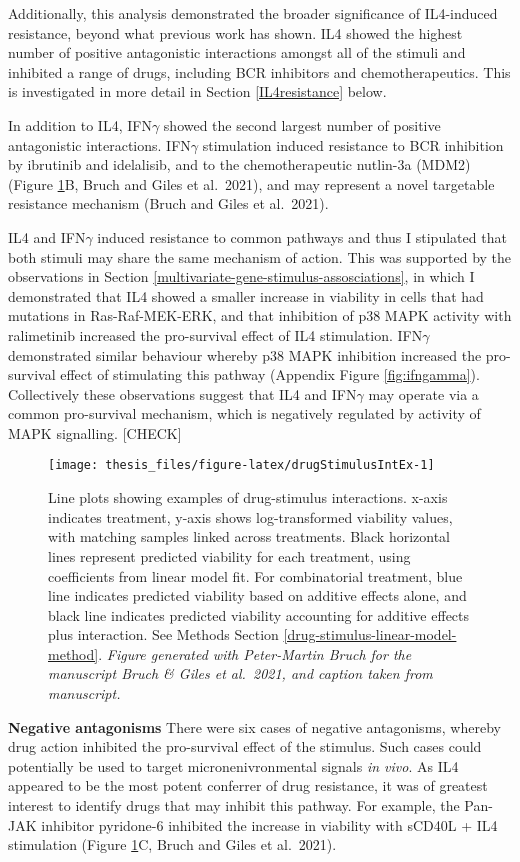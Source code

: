 \documentclass[11pt, a4paper, twosided]{book}
\begin{document}
Additionally, this analysis demonstrated the broader significance of IL4-induced resistance, beyond what previous work has shown. IL4 showed the highest number of positive antagonistic interactions amongst all of the stimuli and inhibited a range of drugs, including BCR inhibitors and chemotherapeutics. This is investigated in more detail in Section \ref{IL4resistance} below.

In addition to IL4, IFN\(\gamma\) showed the second largest number of positive antagonistic interactions. IFN\(\gamma\) stimulation induced resistance to BCR inhibition by ibrutinib and idelalisib, and to the chemotherapeutic nutlin-3a (MDM2) (Figure \ref{fig:drugStimulusIntEx}B, Bruch and Giles et al.~2021), and may represent a novel targetable resistance mechanism (Bruch and Giles et al.~2021).

IL4 and IFN\(\gamma\) induced resistance to common pathways and thus I stipulated that both stimuli may share the same mechanism of action. This was supported by the observations in Section \ref{multivariate-gene-stimulus-assosciations}, in which I demonstrated that IL4 showed a smaller increase in viability in cells that had mutations in Ras-Raf-MEK-ERK, and that inhibition of p38 MAPK activity with ralimetinib increased the pro-survival effect of IL4 stimulation. IFN\(\gamma\) demonstrated similar behaviour whereby p38 MAPK inhibition increased the pro-survival effect of stimulating this pathway (Appendix Figure \ref{fig:ifngamma}). Collectively these observations suggest that IL4 and IFN\(\gamma\) may operate via a common pro-survival mechanism, which is negatively regulated by activity of MAPK signalling. {[}CHECK{]}


\begin{figure}

{\centering \texttt{[image: thesis\_files/figure-latex/drugStimulusIntEx-1]} 

}

\caption{Line plots showing examples of drug-stimulus interactions. x-axis indicates treatment, y-axis shows log-transformed viability values, with matching samples linked across treatments. Black horizontal lines represent predicted viability for each treatment, using coefficients from linear model fit. For combinatorial treatment, blue line indicates predicted viability based on additive effects alone, and black line indicates predicted viability accounting for additive effects plus interaction. See Methods Section \ref{drug-stimulus-linear-model-method}. \emph{Figure generated with Peter-Martin Bruch for the manuscript Bruch \& Giles et al.~2021, and caption taken from manuscript.}}\label{fig:drugStimulusIntEx}
\end{figure}
\textbf{Negative antagonisms} There were six cases of negative antagonisms, whereby drug action inhibited the pro-survival effect of the stimulus. Such cases could potentially be used to target micronenivronmental signals \emph{in vivo}. As IL4 appeared to be the most potent conferrer of drug resistance, it was of greatest interest to identify drugs that may inhibit this pathway. For example, the Pan-JAK inhibitor pyridone-6 inhibited the increase in viability with sCD40L + IL4 stimulation (Figure \ref{fig:drugStimulusIntEx}C, Bruch and Giles et al.~2021).
\end{document}
